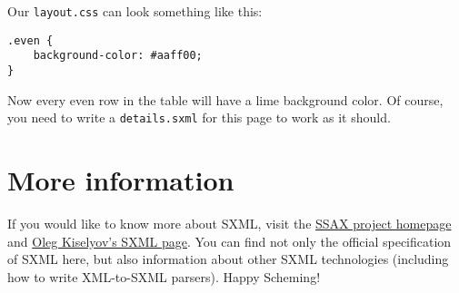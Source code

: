 \documentclass{article}
\begin{document}
Our \verb|layout.css| can look something like this:

\begin{verbatim}
.even {
    background-color: #aaff00;
}
\end{verbatim}

Now every even row in the table will have a lime background color.
Of course, you need to write a \verb|details.sxml| for this page to
work as it should.

\section{More information}

If you would like to know more about SXML, visit the
\href{http://ssax.sourceforge.net}{SSAX project homepage} and
\href{http://www.okmij.org/ftp/Scheme/xml.html}{Oleg Kiselyov's
  SXML page}.  You can find not only the official specification of
SXML here, but also information about other SXML technologies
(including how to write XML-to-SXML parsers).  Happy Scheming!
\end{document}
